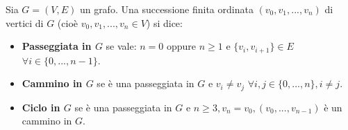 \begin{tcolorbox}[colback=yellow!30, colframe=yellow!30!black, title={Passeggiate, cammini, cicli}]
Sia $G=(V,E)$ un grafo. Una successione finita ordinata $(v_0,v_1,...,v_n)$
di vertici di $G$ (cioè $v_0,v_1,...,v_n \in V$) si dice:
\begin{itemize}
\item \textbf{Passeggiata in $G$} se vale: $n=0$ oppure $n\geq 1$ e $\{v_i,v_{i+1}\}\in E$ $\forall i \in \{0,...,n-1\}$.
\item \textbf{Cammino in $G$} se è una passeggiata in $G$ e $v_i \not = v_j$ $\forall i,j \in \{0,...,n\}, i\not = j$.
\item \textbf{Ciclo in $G$} se è una passeggiata in $G$ e $n \geq 3, v_n=v_0, (v_0,...,v_{n-1})$ è un cammino in $G$.
\end{itemize}
\end{tcolorbox}


